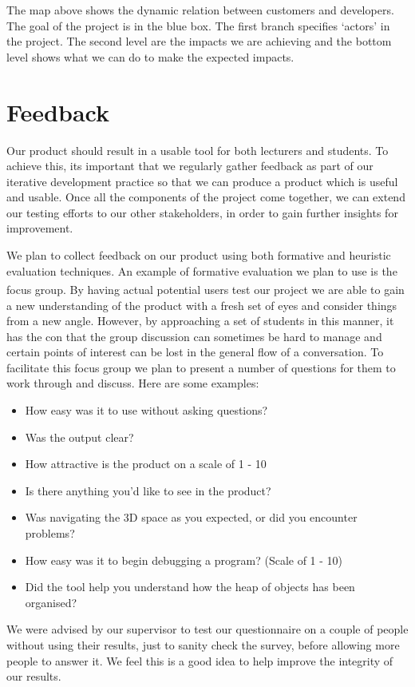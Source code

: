 \documentclass[10pt, a4paper]{article}
\begin{document}
The map above shows the dynamic relation between customers and developers. The goal of the project is in the blue box. The first branch specifies ‘actors’ in the project. The second level are the impacts we are achieving and the bottom level shows what we can do to make the expected impacts. 

\section{Feedback}

Our product should result in a usable tool for both lecturers and students. To achieve this, its important that we regularly gather feedback as part of our iterative development practice so that we can produce a product which is useful and usable. Once all the components of the project come together, we can extend our testing efforts to our other stakeholders, in order to gain further insights for improvement. 

We plan to collect feedback on our product using both formative and heuristic evaluation techniques. An example of formative evaluation we plan to use is the focus group\textsuperscript{\cite{focus}}. By having actual potential users test our project we are able to gain a new understanding of the product with a fresh set of eyes and consider things from a new angle. However, by approaching a set of students in this manner, it has the con that the group discussion can sometimes be hard to manage and certain points of interest can be lost in the general flow of a conversation. To facilitate this focus group we plan to present a number of questions for them to work through and discuss. Here are some examples:
\begin{itemize}

  \item How easy was it to use without asking questions?
  \item Was the output clear?
  \item How attractive is the product on a scale of 1 - 10
  \item Is there anything you’d like to see in the product? 
  \item Was navigating the 3D space as you expected, or did you encounter problems? 
  \item How easy was it to begin debugging a program? (Scale of 1 - 10) 
  \item Did the tool help you understand how the heap of objects has been organised? 
      
\end{itemize}
We were advised by our supervisor to test our questionnaire on a couple of people without using their results, just to sanity check the survey, before allowing more people to answer it. We feel this is a good idea to help improve the integrity of our results.
\end{document}

